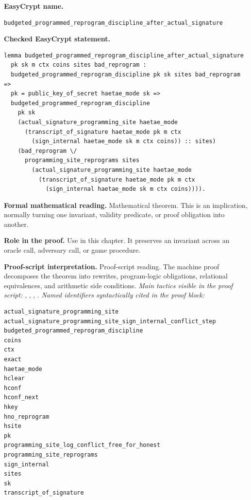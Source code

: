 \begin{formaltheorem}
\noindent\textbf{EasyCrypt name.}
\begin{lstlisting}[language=EasyCrypt,basicstyle=\ttfamily\scriptsize]
budgeted_programmed_reprogram_discipline_after_actual_signature
\end{lstlisting}
\noindent\textbf{Checked EasyCrypt statement.}
\begin{lstlisting}[language=EasyCrypt,basicstyle=\ttfamily\scriptsize]
lemma budgeted_programmed_reprogram_discipline_after_actual_signature
  pk sk m ctx coins sites bad_reprogram :
  budgeted_programmed_reprogram_discipline pk sk sites bad_reprogram =>
  pk = public_key_of_secret haetae_mode sk =>
  budgeted_programmed_reprogram_discipline
    pk sk
    (actual_signature_programming_site haetae_mode
      (transcript_of_signature haetae_mode pk m ctx
        (sign_internal haetae_mode sk m ctx coins)) :: sites)
    (bad_reprogram \/
      programming_site_reprograms sites
        (actual_signature_programming_site haetae_mode
          (transcript_of_signature haetae_mode pk m ctx
            (sign_internal haetae_mode sk m ctx coins)))).
\end{lstlisting}
\noindent\textbf{Formal mathematical reading.}
Mathematical theorem. This is an implication, normally turning one invariant, validity predicate, or proof obligation into another.

\noindent\textbf{Role in the proof.}
Use in this chapter. It preserves an invariant across an oracle call, adversary call, or game procedure.

\noindent\textbf{Proof-script interpretation.}
Proof-script reading. The machine proof decomposes the theorem into rewrites, program-logic obligations, relational equivalences, and arithmetic side conditions.
\emph{Main tactics visible in the proof script:} , , , .
\emph{Named identifiers syntactically cited in the proof block:}
\begin{lstlisting}[language=EasyCrypt,basicstyle=\ttfamily\scriptsize]
actual_signature_programming_site
actual_signature_programming_site_sign_internal_conflict_step
budgeted_programmed_reprogram_discipline
coins
ctx
exact
haetae_mode
hclear
hconf
hconf_next
hkey
hno_reprogram
hsite
pk
programming_site_log_conflict_free_for_honest
programming_site_reprograms
sign_internal
sites
sk
transcript_of_signature
\end{lstlisting}

\end{formaltheorem}

